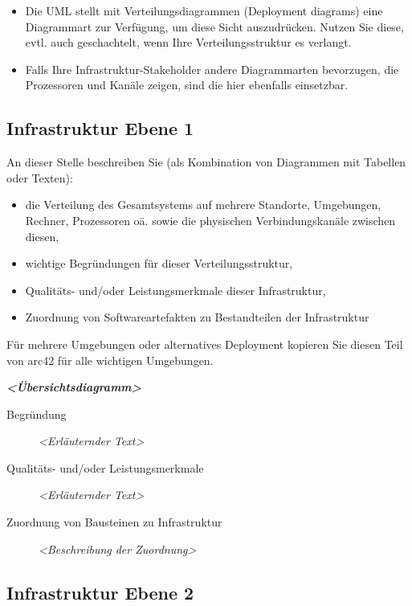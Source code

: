 \documentclass[]{article}
\begin{document}
\begin{itemize}
\item
  Die UML stellt mit Verteilungsdiagrammen (Deployment diagrams) eine
  Diagrammart zur Verfügung, um diese Sicht auszudrücken. Nutzen Sie
  diese, evtl. auch geschachtelt, wenn Ihre Verteilungsstruktur es
  verlangt.
\item
  Falls Ihre Infrastruktur-Stakeholder andere Diagrammarten bevorzugen,
  die Prozessoren und Kanäle zeigen, sind die hier ebenfalls einsetzbar.
\end{itemize}

\subsection{Infrastruktur Ebene 1}\label{_infrastruktur_ebene_1}

An dieser Stelle beschreiben Sie (als Kombination von Diagrammen mit
Tabellen oder Texten):

\begin{itemize}
\item
  die Verteilung des Gesamtsystems auf mehrere Standorte, Umgebungen,
  Rechner, Prozessoren oä. sowie die physischen Verbindungskanäle
  zwischen diesen,
\item
  wichtige Begründungen für dieser Verteilungsstruktur,
\item
  Qualitäts- und/oder Leistungsmerkmale dieser Infrastruktur,
\item
  Zuordnung von Softwareartefakten zu Bestandteilen der Infrastruktur
\end{itemize}

Für mehrere Umgebungen oder alternatives Deployment kopieren Sie diesen
Teil von arc42 für alle wichtigen Umgebungen.

\emph{\textbf{\textless{}Übersichtsdiagramm\textgreater{}}}

\begin{description}
\item[Begründung]
\emph{\textless{}Erläuternder Text\textgreater{}}
\item[Qualitäts- und/oder Leistungsmerkmale]
\emph{\textless{}Erläuternder Text\textgreater{}}
\item[Zuordnung von Bausteinen zu Infrastruktur]
\emph{\textless{}Beschreibung der Zuordnung\textgreater{}}
\end{description}

\subsection{Infrastruktur Ebene 2}\label{_infrastruktur_ebene_2}
\end{document}
